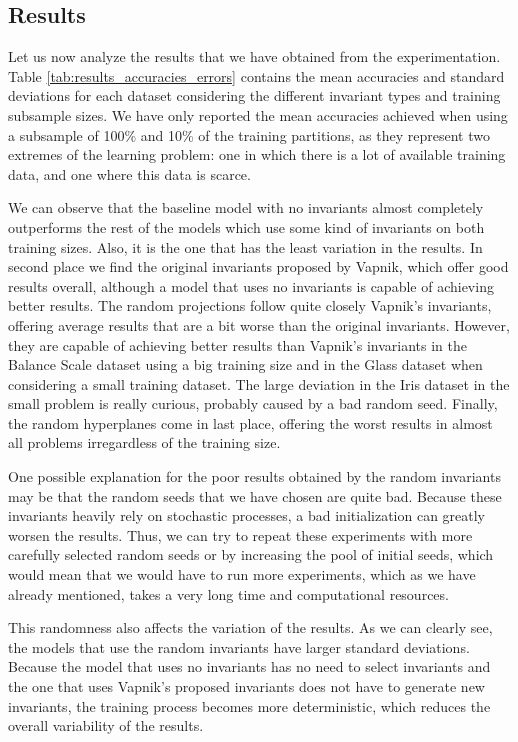 \subsection{Results}

Let us now analyze the results that we have obtained from the experimentation. Table \ref{tab:results_accuracies_errors}
contains the mean accuracies and standard deviations for each dataset considering the different invariant types
and training subsample sizes. We have only reported the mean accuracies achieved when using a subsample
of 100\% and 10\% of the training partitions, as they represent two extremes of the learning problem: one in which
there is a lot of available training data, and one where this data is scarce.

We can observe that the baseline model with no invariants almost completely outperforms the rest of the
models which use some kind of invariants on both training sizes. Also, it is the one that has the
least variation in the results. In second place we find the original invariants proposed by Vapnik, which
offer good results overall, although a model that uses no invariants is capable of achieving better results.
The random projections follow quite closely Vapnik's invariants, offering average results that are a bit worse
than the original invariants. However, they are capable of achieving better results than Vapnik's invariants in
the Balance Scale dataset using a big training size and in the Glass dataset when considering a small training
dataset. The large deviation in the Iris dataset in the small problem is really curious, probably caused by a
bad random seed. Finally, the random hyperplanes come in last place, offering the worst results in almost all
problems irregardless of the training size.

One possible explanation for the poor results obtained by the random invariants may be that the random
seeds that we have chosen are quite bad. Because these invariants heavily rely on stochastic processes,
a bad initialization can greatly worsen the results. Thus, we can try to repeat these
experiments with more carefully selected random seeds or by increasing the pool of initial seeds, which
would mean that we would have to run more experiments, which as we have already mentioned, takes a very long
time and computational resources.

This randomness also affects the variation of the results. As we can clearly see, the models that use the
random invariants have larger standard deviations. Because the model that uses no invariants has no
need to select invariants and the one that uses Vapnik's proposed invariants does not have to generate new
invariants, the training process becomes more deterministic, which reduces the overall variability of the results.

